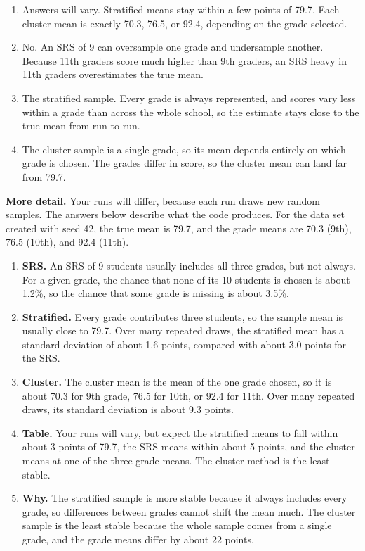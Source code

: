 \begin{Answer}[ref={ex:sampling-compare}]
\begin{enumerate}
    \item Answers will vary. Stratified means stay within a few points of 79.7. Each cluster mean is exactly 70.3, 76.5, or 92.4, depending on the grade selected.
    \item No. An SRS of 9 can oversample one grade and undersample another. Because 11th graders score much higher than 9th graders, an SRS heavy in 11th graders overestimates the true mean.
    \item The stratified sample. Every grade is always represented, and scores vary less within a grade than across the whole school, so the estimate stays close to the true mean from run to run.
    \item The cluster sample is a single grade, so its mean depends entirely on which grade is chosen. The grades differ in score, so the cluster mean can land far from 79.7.
\end{enumerate}

\textbf{More detail.} Your runs will differ, because each run draws new random samples. The answers below describe what the code produces. For the data set created with seed 42, the true mean is 79.7, and the grade means are 70.3 (9th), 76.5 (10th), and 92.4 (11th).
\begin{enumerate}
    \item \textbf{SRS.} An SRS of 9 students usually includes all three grades, but not always. For a given grade, the chance that none of its 10 students is chosen is about 1.2\%, so the chance that some grade is missing is about 3.5\%.
    \item \textbf{Stratified.} Every grade contributes three students, so the sample mean is usually close to 79.7. Over many repeated draws, the stratified mean has a standard deviation of about 1.6 points, compared with about 3.0 points for the SRS.
    \item \textbf{Cluster.} The cluster mean is the mean of the one grade chosen, so it is about 70.3 for 9th grade, 76.5 for 10th, or 92.4 for 11th. Over many repeated draws, its standard deviation is about 9.3 points.
    \item \textbf{Table.} Your runs will vary, but expect the stratified means to fall within about 3 points of 79.7, the SRS means within about 5 points, and the cluster means at one of the three grade means. The cluster method is the least stable.
    \item \textbf{Why.} The stratified sample is more stable because it always includes every grade, so differences between grades cannot shift the mean much. The cluster sample is the least stable because the whole sample comes from a single grade, and the grade means differ by about 22 points.
\end{enumerate}
\end{Answer}


